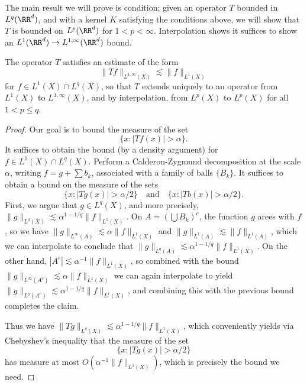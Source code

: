 The main result we will prove is condition; given an operator $T$ bounded in $L^q(\RR^d)$, and with a kernel $K$ satisfying the conditions above, we will show that $T$ is bounded on $L^p(\RR^d)$ for $1 < p < \infty$. Interpolation shows it suffices to show an $L^1(\RR^d) \to L^{1,\infty}(\RR^d)$ bound.

\begin{theorem}
    The operator $T$ satisfies an estimate of the form
    \[ \| Tf \|_{L^{1,\infty}(X)} \lesssim \| f \|_{L^1(X)} \]
    for $f \in L^1(X) \cap L^q(X)$, so that $T$ extends uniquely to an operator from $L^1(X)$ to $L^{1,\infty}(X)$, and by interpolation, from $L^p(X)$ to $L^p(X)$ for all $1 < p \leq q$.
\end{theorem}
\begin{proof}
    Our goal is to bound the measure of the set
    \[ \{ x : |Tf(x)| > \alpha \}. \]
    It suffices to obtain the bound (by a density argument) for $f \in L^1(X) \cap L^q(X)$. Perform a Calderon-Zygmund decomposition at the scale $\alpha$, writing $f = g + \sum b_k$, associated with a family of balls $\{ B_k \}$. It suffices to obtain a bound on the measure of the sets
    \[ \{ x : |Tg(x)| > \alpha/2 \} \quad\text{and}\quad \{ x : |Tb(x)| > \alpha/2 \}. \]
    First, we argue that $g \in L^q(X)$, and more precisely, $\| g \|_{L^q(X)} \lesssim \alpha^{1-1/q} \| f \|_{L^1(X)}$. On $A = (\bigcup B_k)^c$, the function $g$ arees with $f$, so we have $\| g \|_{L^\infty(A)} \lesssim \alpha \| f \|_{L^1(X)}$ and $\| g \|_{L^1(A)} \lesssim \| f \|_{L^1(A)}$, which we can interpolate to conclude that $\| g \|_{L^q(A)} \lesssim \alpha^{1-1/q} \| f \|_{L^1(X)}$. On the other hand, $|A^c| \lesssim \alpha^{-1} \| f \|_{L^1(X)}$, so combined with the bound $\| g \|_{L^\infty(A^c)} \lesssim \alpha \| f \|_{L^1(X)}$ we can again interpolate to yield $\| g \|_{L^q(A^c)} \lesssim \alpha^{1-1/q} \| f \|_{L^1(X)}$, and combining this with the previous bound completes the claim.

    Thus we have $\| Tg \|_{L^q(X)} \lesssim \alpha^{1-1/q} \| f \|_{L^1(X)}$, which conveniently yields via Chebyshev's inequality that the measure of the set
    \[ \{ x : |Tg(x)| > \alpha / 2 \} \]
    has measure at most $O(\alpha^{-1} \| f \|_{L^1(X)})$, which is precisely the bound we need.


\end{proof}
